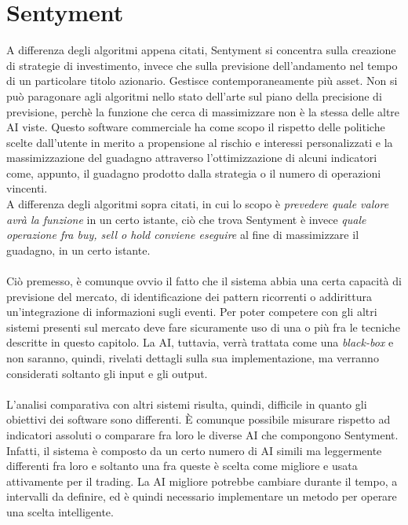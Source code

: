 \documentclass[a4paper,12pt]{report}
\begin{document}
\newpage
\section{Sentyment}
A differenza degli algoritmi appena citati, Sentyment si concentra sulla creazione di strategie di investimento, invece che sulla previsione dell'andamento nel tempo di un particolare titolo azionario. Gestisce contemporaneamente più asset. Non si può paragonare agli algoritmi nello stato dell'arte sul piano della precisione di previsione, perchè la funzione che cerca di massimizzare non è la stessa delle altre AI viste. Questo software commerciale ha come scopo il rispetto delle politiche scelte dall'utente in merito a propensione al rischio e interessi personalizzati e la massimizzazione del guadagno attraverso l'ottimizzazione di alcuni indicatori come, appunto, il guadagno prodotto dalla strategia o il numero di operazioni vincenti.\\ A differenza degli algoritmi sopra citati, in cui lo scopo è \textit{prevedere quale valore avrà la funzione} in un certo istante, ciò che trova Sentyment è invece \textit{quale operazione fra buy, sell o hold conviene eseguire} al fine di massimizzare il guadagno, in un certo istante.\\~\\
Ciò premesso, è comunque ovvio il fatto che il sistema abbia una certa capacità di previsione del mercato, di identificazione dei pattern ricorrenti o addirittura un'integrazione di informazioni sugli eventi. Per poter competere con gli altri sistemi presenti sul mercato deve fare sicuramente uso di una o più fra le tecniche descritte in questo capitolo. La AI, tuttavia, verrà trattata come una \textit{black-box} e non saranno, quindi, rivelati dettagli sulla sua implementazione, ma verranno considerati soltanto gli input e gli output.\\~\\ L'analisi comparativa con altri sistemi risulta, quindi, difficile in quanto gli obiettivi dei software sono differenti. È comunque possibile misurare rispetto ad indicatori assoluti o comparare fra loro le diverse AI che compongono Sentyment. Infatti, il sistema è composto da un certo numero di AI simili ma leggermente differenti fra loro e soltanto una fra queste è scelta come migliore e usata attivamente per il trading. La AI migliore potrebbe cambiare durante il tempo, a intervalli da definire, ed è quindi necessario implementare un metodo per operare una scelta intelligente.
\end{document}
